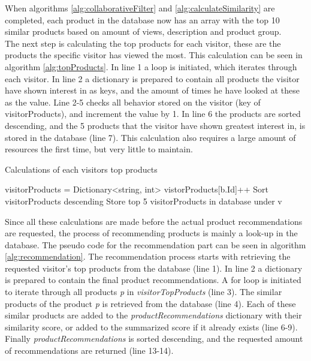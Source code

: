 When algorithms \ref{alg:collaborativeFilter} and \ref{alg:calculateSimilarity} are completed, each product in the database now has an array with the top 10 similar products based on amount of views, description and product group. \\
The next step is calculating the top products for each visitor, these are the products the specific visitor has viewed the most. This calculation can be seen in algorithm \ref{alg:topProducts}. In line 1 a loop is initiated, which iterates through each visitor. In line 2 a dictionary is prepared to contain all products the visitor have shown interest in as keys, and the amount of times he have looked at these as the value. Line 2-5 checks all behavior stored on the visitor (key of visitorProducts), and increment the value by 1. In line 6 the products are sorted descending, and the 5 products that the visitor have shown greatest interest in, is stored in the database (line 7). This calculation also requires a large amount of resources the first time, but very little to maintain.

\begin{algorithm}[H]
\caption{Calculations of each visitors top products}
\label{alg:topProducts}
\begin{algorithmic}[1]
\State visitorProducts = Dictionary<string, int>
\State vistorProducts[b.Id]++
\EndFor
\State Sort visitorProducts descending
\State Store top 5 visitorProducts in database under v
\EndFor
\end{algorithmic}
\end{algorithm}

Since all these calculations are made before the actual product recommendations are requested, the process of recommending products is mainly a look-up in the database. The pseudo code for the recommendation part can be seen in algorithm \ref{alg:recommendation}. The recommendation process starts with retrieving the requested visitor's top products from the database (line 1). In line 2 a dictionary is prepared to contain the final product recommendations. A for loop is initiated to iterate through all products \textit{p} in \textit{visitorTopProducts} (line 3). The similar products of the product \textit{p} is retrieved from the database (line 4). Each of these similar products are added to the \textit{productRecommendations} dictionary with their similarity score, or added to the summarized score if it already exists (line 6-9). Finally \textit{productRecommendations} is sorted descending, and the requested amount of recommendations are returned (line 13-14). 

